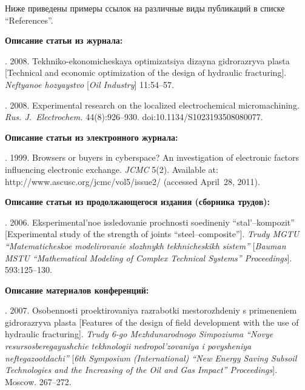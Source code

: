 {\begin{enumerate}[1.]
Ниже приведены примеры ссылок на различные виды публикаций в списке ``References''.

\def\leftfootline{\small{\textbf{\thepage}
\hfill ИНФОРМАТИКА И ЕЁ ПРИМЕНЕНИЯ\ \ \ том\ 9\ \ \ выпуск\ 2\ \ \ 2015}
}%
 \def\rightfootline{\small{ИНФОРМАТИКА И ЕЁ ПРИМЕНЕНИЯ\ \ \ том\ 9\ \ \ выпуск\ 2\ \ \ 2015
\hfill \textbf{\thepage}}}

{\small

\noindent
\textbf{Описание статьи из журнала:}

. 2008.
Tekhniko-ekonomicheskaya optimizatsiya dizayna gidrorazryva plasta [Technical and
economic optimization of the design
of hydraulic fracturing]. \textit{Neftyanoe hozyaystvo} [\textit{Oil Industry}] 11:54--57.

. 2008. Experimental research on the localized
electrochemical micromachining. \textit{Rus. J.~Electrochem.}  44(8):926--930.
{\sf doi:10.1134/S1023193508080077}.

\noindent
\textbf{Описание статьи из электронного журнала:}

. 1999. Browsers or buyers in cyberspace? An
investigation of electronic factors influencing electronic exchange. \textit{JCMC}
5(2). Available at: {\sf http://www.ascusc.org/jcmc/vol5/issue2/} (accessed April~28, 2011).

\def\leftkol{Правила подготовки рукописей  для публикации в журнале
<<Информатика и её применения>>}

\def\rightkol{Правила подготовки рукописей  для публикации в журнале
<<Информатика и её применения>>}


\noindent
\textbf{Описание статьи из продолжающегося издания (сборника трудов):}

. 2006. Eksperimental'noe
issledovanie prochnosti soedineniy ``stal'--kompozit'' [Experimental study of
the strength of joints ``steel--composite'']. \textit{Trudy MGTU
``Matematicheskoe modelirovanie slozhnykh tekh\-ni\-che\-skikh sistem''}
[\textit{Bauman MSTU ``Mathematical Modeling of Complex Technical
Systems'' Proceedings}]. 593:125--130.


\pagebreak



\noindent
\textbf{Описание материалов конференций:}

. 2007. Osobennosti proektirovaniya razrabotki mestorozhdeniy
s primeneniem gidrorazryva
plasta [Features of the design of field development with the use of hydraulic fracturing].
\textit{Trudy 6-go
Mezhdu\-na\-rod\-no\-go Simpoziuma ``Novye resursosberegayushchie tekhnologii nedropol'zovaniya i povysheniya
neftegazootdachi''} [\textit{6th  Symposium (International) ``New Energy Saving Subsoil Technologies and
the Increasing of the Oil and Gas Impact'' Proceedings}]. Moscow. 267--272.



}
\end{enumerate}}
